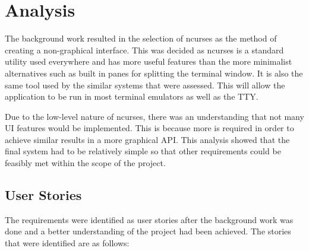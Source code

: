 \section{Analysis}



The background work resulted in the selection of {\selectfont ncurses} as the method of creating a non-graphical interface. This was decided as {\selectfont ncurses} is a standard utility used everywhere and has more useful features than the more minimalist alternatives such as built in panes for splitting the terminal window. It is also the same tool used by the similar systems that were assessed. This will allow the application to be run in most terminal emulators as well as the {\selectfont TTY}.

Due to the low-level nature of {\selectfont ncurses}, there was an understanding that not many UI features would be implemented. This is because more is required in order to achieve similar results in a more graphical API. This analysis showed that the final system had to be relatively simple so that other requirements could be feasibly met within the scope of the project.

\subsection{User Stories}
\label{user_stories}

The requirements were identified as user stories after the background work was done and a better understanding of the project had been achieved. The stories that were identified are as follows:

